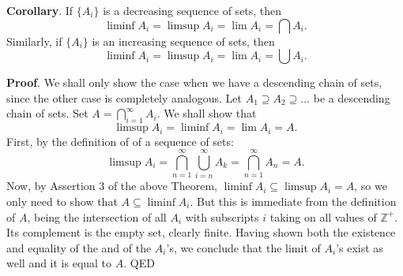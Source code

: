 \documentclass[12pt]{article}
\begin{document}
\textbf{Corollary}.  If $\lbrace A_i \rbrace$ is a decreasing
sequence of sets, then $$\liminf A_i=\limsup A_i=\lim A_i=\bigcap
A_i.$$  Similarly, if $\lbrace A_i \rbrace$ is an increasing
sequence of sets, then $$\liminf A_i=\limsup A_i=\lim A_i=\bigcup
A_i.$$

\textbf{Proof}.  We shall only show the case when we have a
descending chain of sets, since the other case is completely
analogous.  Let $A_1\supseteq A_2\supseteq\ldots$ be a descending
chain of sets.  Set $A=\bigcap_{i=1}^\infty A_i$.  We shall show
that $$\limsup A_i=\liminf A_i=\lim A_i=A.$$  First, by the
definition of  of a sequence of sets:
$$\limsup A_i=\bigcap_{n=1}^\infty \bigcup_{i=n}^\infty
A_k=\bigcap_{n=1}^\infty A_n=A.$$  Now, by Assertion 3 of the above
Theorem, $\liminf A_i\subseteq\limsup A_i=A$, so we only need to
show that $A\subseteq\liminf A_i$.  But this is immediate from the
definition of $A$, being the intersection of all $A_i$ with subscripts $i$ taking on all values of $\mathbb{Z}^{+}$.  Its complement is the empty
set, clearly finite.  Having shown both the existence and equality
of the  and  of the $A_i$'s, we conclude
that the limit of $A_i$'s exist as well and it is equal to $A$.
QED
\end{document}
